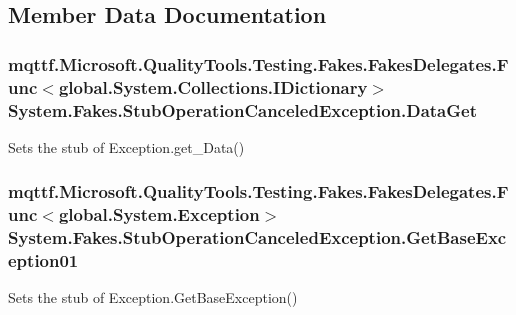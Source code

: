 \subsection{Member Data Documentation}
\hypertarget{class_system_1_1_fakes_1_1_stub_operation_canceled_exception_ab1545011b7e13a4aee5e68fea32bd40e}{
\subsubsection[{Data\-Get}]{\setlength{\rightskip}{0pt plus 5cm}mqttf.\-Microsoft.\-Quality\-Tools.\-Testing.\-Fakes.\-Fakes\-Delegates.\-Func$<$global.\-System.\-Collections.\-I\-Dictionary$>$ System.\-Fakes.\-Stub\-Operation\-Canceled\-Exception.\-Data\-Get}}\label{class_system_1_1_fakes_1_1_stub_operation_canceled_exception_ab1545011b7e13a4aee5e68fea32bd40e}


Sets the stub of Exception.\-get\-\_\-\-Data()

\hypertarget{class_system_1_1_fakes_1_1_stub_operation_canceled_exception_a6b6ef7dcfbf3c74dad4752a5f303b789}{
\subsubsection[{Get\-Base\-Exception01}]{\setlength{\rightskip}{0pt plus 5cm}mqttf.\-Microsoft.\-Quality\-Tools.\-Testing.\-Fakes.\-Fakes\-Delegates.\-Func$<$global.\-System.\-Exception$>$ System.\-Fakes.\-Stub\-Operation\-Canceled\-Exception.\-Get\-Base\-Exception01}}\label{class_system_1_1_fakes_1_1_stub_operation_canceled_exception_a6b6ef7dcfbf3c74dad4752a5f303b789}


Sets the stub of Exception.\-Get\-Base\-Exception()

